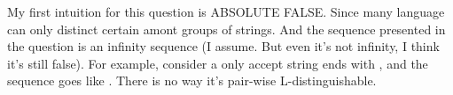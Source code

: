 \documentclass{article}
\begin{document}
\maketitle
My first intuition for this question is ABSOLUTE FALSE. Since many language can only distinct certain amont groups of strings. And the sequence presented in the question is an infinity sequence (I assume. But even it's not infinity, I think it's still false). For example, consider a  only accept string ends with , and the sequence goes like . There is no way it's pair-wise L-distinguishable.
\end{document}
